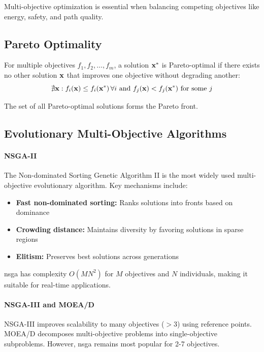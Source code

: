 Multi-objective optimization is essential when balancing competing objectives like energy, safety, and path quality.

\subsection{Pareto Optimality}

For multiple objectives $f_1, f_2, \ldots, f_m$, a solution $\mathbf{x}^*$ is Pareto-optimal if there exists no other solution $\mathbf{x}$ that improves one objective without degrading another:
\begin{equation}
\nexists \mathbf{x} : f_i(\mathbf{x}) \leq f_i(\mathbf{x}^*) \, \forall i \text{ and } f_j(\mathbf{x}) < f_j(\mathbf{x}^*) \text{ for some } j
\end{equation}

The set of all Pareto-optimal solutions forms the Pareto front.

\subsection{Evolutionary Multi-Objective Algorithms}

\paragraph{NSGA-II}
The Non-dominated Sorting Genetic Algorithm II \cite{Deb2002} is the most widely used multi-objective evolutionary algorithm. Key mechanisms include:
\begin{itemize}
    \item \textbf{Fast non-dominated sorting:} Ranks solutions into fronts based on dominance
    \item \textbf{Crowding distance:} Maintains diversity by favoring solutions in sparse regions
    \item \textbf{Elitism:} Preserves best solutions across generations
\end{itemize}

\acrshort{nsga} has complexity $O(MN^2)$ for $M$ objectives and $N$ individuals, making it suitable for real-time applications.

\paragraph{NSGA-III and MOEA/D}
NSGA-III \cite{Deb2014} improves scalability to many objectives ($>$3) using reference points. MOEA/D \cite{Zhang2007} decomposes multi-objective problems into single-objective subproblems. However, \acrshort{nsga} remains most popular for 2-7 objectives.

